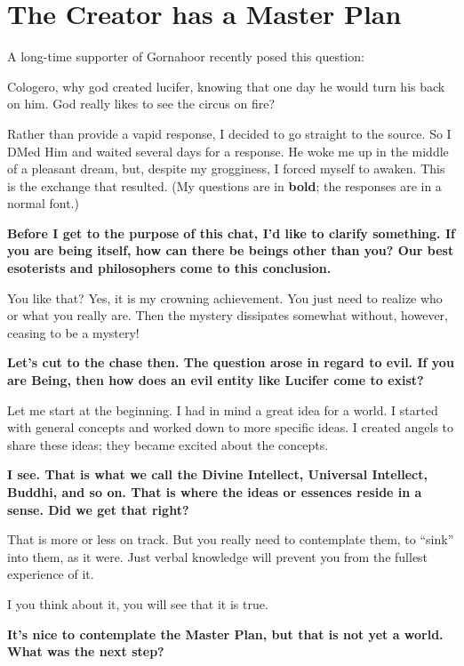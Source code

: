 \section{The Creator has a Master Plan}

A long-time supporter of Gornahoor recently posed this question:

\begin{quotex}
Cologero, why god created lucifer, knowing that one day he would turn his back on him. God really likes to see the circus on fire?
\end{quotex}


Rather than provide a vapid response, I decided to go straight to the source. So I DMed Him and waited several days for a response. He woke me up in the middle of a pleasant dream, but, despite my grogginess, I forced myself to awaken. This is the exchange that resulted. (My questions are in \textbf{bold}; the responses are in a normal font.)

\textbf{Before I get to the purpose of this chat, I'd like to clarify something. If you are being itself, how can there be beings other than you? Our best esoterists and philosophers come to this conclusion.}

You like that? Yes, it is my crowning achievement. You just need to realize who or what you really are. Then the mystery dissipates somewhat without, however, ceasing to be a mystery!

\textbf{Let's cut to the chase then. The question arose in regard to evil. If you are Being, then how does an evil entity like Lucifer come to exist?}

Let me start at the beginning. I had in mind a great idea for a world. I started with general concepts and worked down to more specific ideas. I created angels to share these ideas; they became excited about the concepts.

\textbf{I see. That is what we call the Divine Intellect, Universal Intellect, Buddhi, and so on. That is where the ideas or essences reside in a sense. Did we get that right?}

That is more or less on track. But you really need to contemplate them, to ``sink'' into them, as it were. Just verbal knowledge will prevent you from the fullest experience of it.

I you think about it, you will see that it is true.

\textbf{It's nice to contemplate the Master Plan, but that is not yet a world. What was the next step?}

